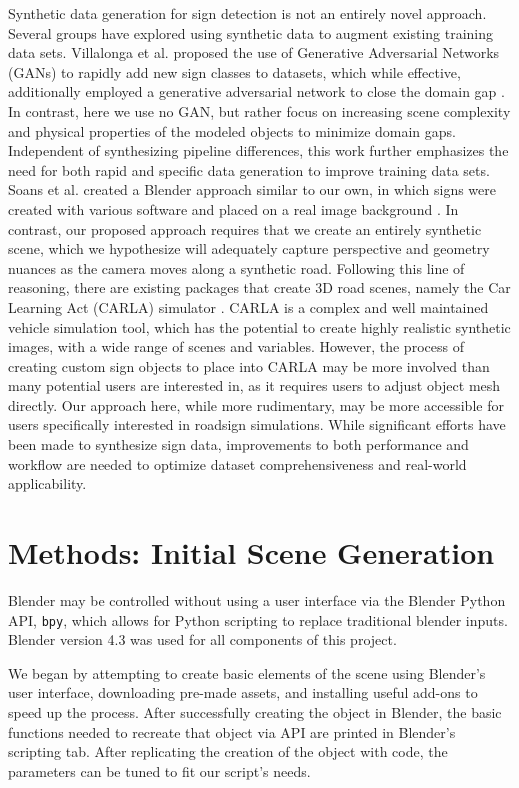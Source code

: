 \documentclass[journal]{IEEEtran}
\begin{document}
 Synthetic data generation for sign detection is not an entirely novel approach. Several groups have explored using synthetic data to augment existing training data sets. Villalonga et al. proposed the use of Generative Adversarial Networks (GANs) to rapidly add new sign classes to datasets, which while effective, additionally employed a generative adversarial network to close the domain gap \cite{GAN_artificial_data}. In contrast, here we use no GAN, but rather focus on increasing scene complexity and physical properties of the modeled objects to minimize domain gaps. Independent of synthesizing pipeline differences, this work further emphasizes the need for both rapid and specific data generation to improve training data sets. Soans et al. created a Blender approach similar to our own, in which signs were created with various software and placed on a real image background \cite{blender_paper}. In contrast, our proposed approach requires that we create an entirely synthetic scene, which we hypothesize will adequately capture perspective and geometry nuances as the camera moves along a synthetic road. Following this line of reasoning, there are existing packages that create 3D road scenes, namely  the Car Learning Act (CARLA) simulator \cite{Dosovitskiy17}. CARLA is a complex and well maintained vehicle simulation tool, which has the potential to create highly realistic synthetic images, with a wide range of scenes and variables.  However, the process of creating custom sign objects to place into CARLA may be more involved than many potential users are interested in, as it requires users to adjust object mesh directly. Our approach here, while more rudimentary, may be more accessible for users specifically interested in roadsign simulations. While significant efforts have been made to synthesize sign data, improvements to both performance and workflow are needed to optimize dataset comprehensiveness and real-world applicability. 

 \section{Methods: Initial Scene Generation}
 Blender may be controlled without using a user interface via the Blender Python API, \texttt{bpy}, which allows for Python scripting to replace traditional blender inputs. Blender version 4.3 was used for all components of this project\cite{blender}. 
 
 We began by attempting to create basic elements of the scene using Blender's user interface, downloading pre-made assets, and installing useful add-ons to speed up the process. After successfully creating the object in Blender, the basic functions needed to recreate that object via API are printed in Blender's scripting tab. After replicating the creation of the object with code, the parameters can be tuned to fit our script's needs. 
 
\end{document}
